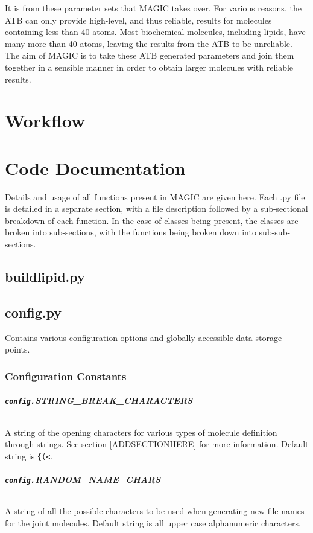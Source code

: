 \documentclass[a4paper,11pt,oneside,openright]{book}
\begin{document}
\par{It is from these parameter sets that MAGIC takes over. For various reasons, the ATB can only provide high-level, and thus reliable, results for molecules containing less than 40 atoms. Most biochemical molecules, including lipids, have many more than 40 atoms, leaving the results from the ATB to be unreliable. The aim of MAGIC is to take these ATB generated parameters and join them together in a sensible manner in order to obtain larger molecules with reliable results.
\chapter{Workflow}\label{ch:workflow}
\chapter{Code Documentation}\label{ch:codedoc}
Details and usage of all functions present in MAGIC are given here. Each .py file is detailed in a separate section, with a file description followed by a sub-sectional breakdown of each function. In the case of classes being present, the classes are broken into sub-sections, with the functions being broken down into sub-sub-sections.
\section{buildlipid.py}\label{sec:buildlipid}
\section{config.py}\label{sec:config}
Contains various configuration options and globally accessible data storage points.
\subsection{Configuration Constants}
\paragraph[\texttt{STRING\_BREAK\_CHARACTERS}]{\texttt{config.}\textbf{STRING\_BREAK\_CHARACTERS}}
\subparagraph{}A string of the opening characters for various types of molecule definition through strings. See section [ADDSECTIONHERE] for more information. Default string is \texttt{\{(<}.
\paragraph[\texttt{RANDOM\_NAME\_CHARS}]{\texttt{config.}\textbf{RANDOM\_NAME\_CHARS}} 
\subparagraph{}A string of all the possible characters to be used when generating new file names for the joint molecules. Default string is all upper case alphanumeric characters.
}
\end{document}
